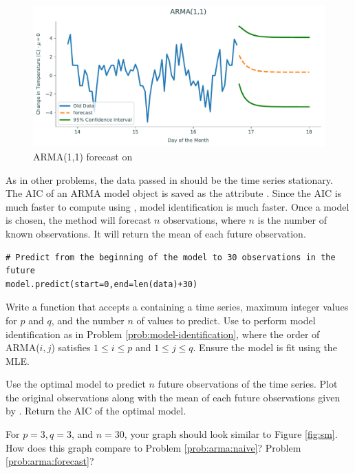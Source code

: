 \begin{figure}
\centering
\includegraphics[width=\textwidth]{figures/arma.pdf}
\caption{ARMA(1,1) forecast on }
\label{fig:forecasted}
\end{figure}

As in other problems, the data passed in should be the time series stationary.
The AIC of an ARMA model object is saved as the attribute .
Since the AIC is much faster to compute using , model identification is much faster.
Once a model is chosen, the method  will forecast $n$ observations, where $n$ is the number of known observations.
It will return the mean of each future observation.

\begin{lstlisting}
# Predict from the beginning of the model to 30 observations in the future
model.predict(start=0,end=len(data)+30)
\end{lstlisting}

\begin{problem}
Write a function  that accepts a  containing a time series, maximum integer values for $p$ and $q$, and the number $n$ of values to predict.
Use  to perform model identification as in Problem \ref{prob:model-identification}, where the order of ARMA($i,j$) satisfies $1\leq i \leq p$ and $1 \leq j \leq q$.
Ensure the model is fit using the MLE.

Use the optimal model to predict $n$ future observations of the time series.
Plot the original observations along with the mean of each future observations given by .
Return the AIC of the optimal model.

For $p=3, q=3$, and $n=30$, your graph should look similar to Figure \ref{fig:sm}.
How does this graph compare to Problem \ref{prob:arma:naive}? Problem \ref{prob:arma:forecast}?
\label{prob:statsmodels}
\end{problem}

